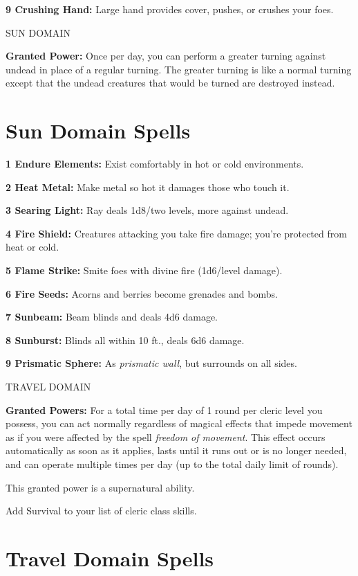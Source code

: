 \documentclass{article}
\begin{document}
\textbf{9 Crushing Hand: }Large hand provides cover, pushes, or crushes your foes.

\vspace{12pt}
SUN DOMAIN

\textbf{Granted Power:} Once per day, you can perform a greater turning against 
undead in place of a regular turning. The greater turning is like a normal turning 
except that the undead creatures that would be turned are destroyed instead.

\section*{\textbf{Sun Domain Spells}}

\textbf{1 Endure Elements: }Exist comfortably in hot or cold environments.

\textbf{2 Heat Metal: }Make metal so hot it damages those who touch it.

\textbf{3 Searing Light: }Ray deals 1d8/two levels, more against undead.

\textbf{4 Fire Shield:} Creatures attacking you take fire damage; you're protected 
from heat or cold.

\textbf{5 Flame Strike: }Smite foes with divine fire (1d6/level damage).

\textbf{6 Fire Seeds: }Acorns and berries become grenades and bombs.

\textbf{7 Sunbeam:} Beam blinds and deals 4d6 damage.

\textbf{8 Sunburst: }Blinds all within 10 ft., deals 6d6 damage.

\textbf{9 Prismatic Sphere: }As \textit{prismatic wall}, but surrounds on all sides.

\vspace{12pt}
TRAVEL DOMAIN

\textbf{Granted Powers:} For a total time per day of 1 round per cleric level you 
possess, you can act normally regardless of magical effects that impede movement 
as if you were affected by the spell \textit{freedom of movement}. This effect 
occurs automatically as soon as it applies, lasts until it runs out or is no longer 
needed, and can operate multiple times per day (up to the total daily limit of 
rounds).

This granted power is a supernatural ability.

Add Survival to your list of cleric class skills.

\section*{\textbf{Travel Domain Spells}}
\end{document}
